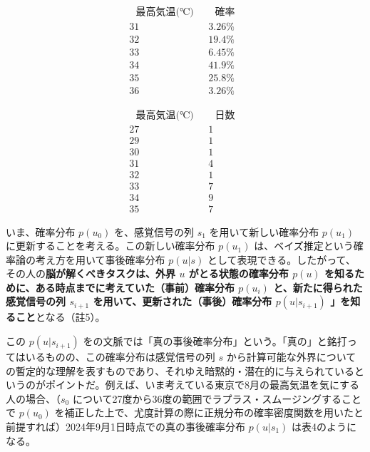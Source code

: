 \[
\begin{array}{cc}
~~~\textrm{最高気温(℃)}~~~ & ~~~\textrm{確率}~~~ \\
\hline
\textrm{31} & \textrm{3.26\%} \\
\textrm{32} & \textrm{19.4\%} \\
\textrm{33} & \textrm{6.45\%} \\
\textrm{34} & \textrm{41.9\%} \\
\textrm{35} & \textrm{25.8\%} \\
\textrm{36} & \textrm{3.26\%}
\end{array}
\tag{表2}
\]

\[
\begin{array}{cc}
~~~\textrm{最高気温(℃)}~~~ & ~~~\textrm{日数}~~~ \\
\hline
\textrm{27} & \textrm{1} \\
\textrm{29} & \textrm{1} \\
\textrm{30} & \textrm{1} \\
\textrm{31} & \textrm{4} \\
\textrm{32} & \textrm{1} \\
\textrm{33} & \textrm{7} \\
\textrm{34} & \textrm{9} \\
\textrm{35} & \textrm{7}
\end{array}
\tag{表3}
\]

いま、確率分布 \(p(u_0)\) を、感覚信号の列 \(s_1\)
を用いて新しい確率分布 \(p(u_1)\)
に更新することを考える。この新しい確率分布 \(p(u_1)\)
は、ベイズ推定という確率論の考え方を用いて事後確率分布 \(p(u|s)\)
として表現できる。したがって、その人の\textbf{脳が解くべきタスクは、外界
\(u\) がとる状態の確率分布 \(p(u)\)
を知るために、ある時点までに考えていた（事前）確率分布 \(p(u_i)\)
と、新たに得られた感覚信号の列 \(s_{i+1}\)
を用いて、更新された（事後）確率分布 \(p(u|s_{i+1})\)
」を知ること}となる（註5）。

この \(p(u|s_{i+1})\)
をの文脈では「真の事後確率分布」という。「真の」と銘打ってはいるものの、この確率分布は感覚信号の列
\(s\)
から計算可能な外界についての暫定的な理解を表すものであり、それゆえ暗黙的・潜在的に与えられているというのがポイントだ。例えば、いま考えている東京で8月の最高気温を気にする人の場合、（\(s_0\)
について27度から36度の範囲でラプラス・スムージングすることで \(p(u_0)\)
を補正した上で、尤度計算の際に正規分布の確率密度関数を用いたと前提すれば）2024年9月1日時点での真の事後確率分布
\(p(u|s_1)\) は表4のようになる。


